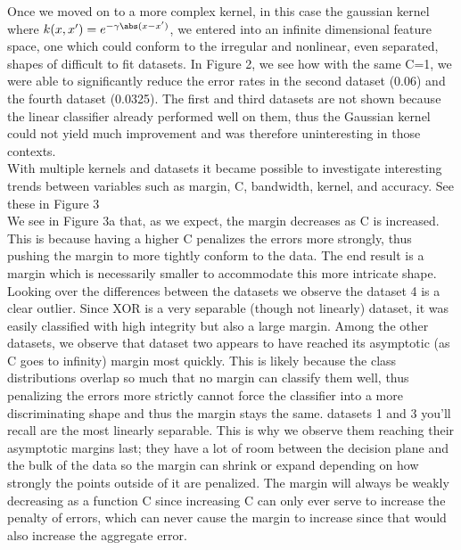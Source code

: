 \documentclass{article}
\begin{document}
Once we moved on to a more complex kernel, in this case the gaussian kernel where $k(x, x') = e^{-\gamma \abs(x - x')}$, we entered into an infinite dimensional feature space, one which could conform to the irregular and nonlinear, even separated, shapes of difficult to fit datasets. In Figure 2, we see how with the same C=1, we were able to significantly reduce the error rates in the second dataset (0.06) and the fourth dataset (0.0325). The first and third datasets are not shown because the linear classifier already performed well on them, thus the Gaussian kernel could not yield much improvement and was therefore uninteresting in those contexts. \\
With multiple kernels and datasets it became possible to investigate interesting trends between variables such as margin, C, bandwidth, kernel, and accuracy. See these in Figure 3\\
We see in Figure 3a that, as we expect, the margin decreases as C is increased. This is because having a higher C penalizes the errors more strongly, thus pushing the margin to more tightly conform to the data. The end result is a margin which is necessarily smaller to accommodate this more intricate shape. Looking over the differences between the datasets we observe the dataset 4 is a clear outlier. Since XOR is a very separable (though not linearly) dataset, it was easily classified with high integrity but also a large margin. Among the other datasets, we observe that dataset two appears to have reached its asymptotic (as C goes to infinity) margin most quickly. This is likely because the class distributions overlap so much that no margin can classify them well, thus penalizing the errors more strictly cannot force the classifier into a more discriminating shape and thus the margin stays the same. datasets 1 and 3 you'll recall are the most linearly separable. This is why we observe them reaching their asymptotic margins last; they have a lot of room between the decision plane and the bulk of the data so the margin can shrink or expand depending on how strongly the points outside of it are penalized. The margin will always be weakly decreasing as a function C since increasing C can only ever serve to increase the penalty of errors, which can never cause the margin to increase since that would also increase the aggregate error.\\
\end{document}
